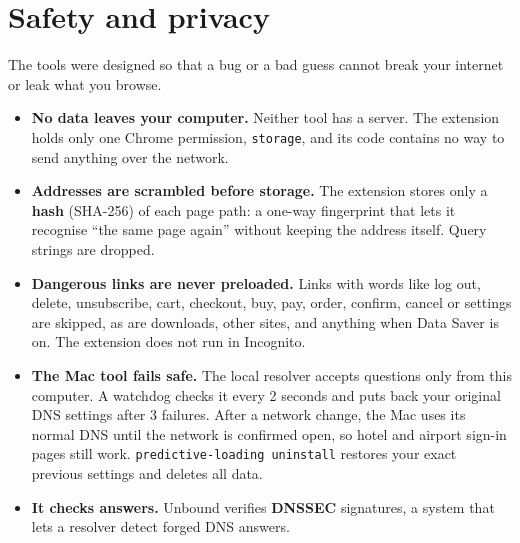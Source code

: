 \documentclass[11pt]{article}
\newcommand{\term}[1]{\textbf{#1}}
\begin{document}
\section{Safety and privacy}
The tools were designed so that a bug or a bad guess cannot break your internet or leak what you browse.
\begin{itemize}
\item \textbf{No data leaves your computer.} Neither tool has a server. The extension holds only one Chrome permission, \texttt{storage}, and its code contains no way to send anything over the network.
\item \textbf{Addresses are scrambled before storage.} The extension stores only a \term{hash} (SHA-256) of each page path: a one-way fingerprint that lets it recognise ``the same page again'' without keeping the address itself. Query strings are dropped.
\item \textbf{Dangerous links are never preloaded.} Links with words like log out, delete, unsubscribe, cart, checkout, buy, pay, order, confirm, cancel or settings are skipped, as are downloads, other sites, and anything when Data Saver is on. The extension does not run in Incognito.
\item \textbf{The Mac tool fails safe.} The local resolver accepts questions only from this computer. A watchdog checks it every 2 seconds and puts back your original DNS settings after 3 failures. After a network change, the Mac uses its normal DNS until the network is confirmed open, so hotel and airport sign-in pages still work. \texttt{predictive-loading uninstall} restores your exact previous settings and deletes all data.
\item \textbf{It checks answers.} Unbound verifies \term{DNSSEC} signatures, a system that lets a resolver detect forged DNS answers.
\end{itemize}
\end{document}
